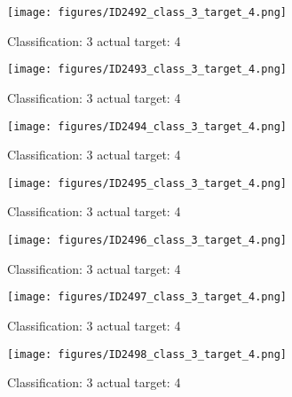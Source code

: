 \begin{figure}[h!]
\begin{center}
\texttt{[image: figures/ID2492\_class\_3\_target\_4.png]}
\end{center}
\caption{ Classification: 3 actual target: 4}
\label{fig:ID2492_class_3_target_4}
\end{figure}
\begin{figure}[h!]
\begin{center}
\texttt{[image: figures/ID2493\_class\_3\_target\_4.png]}
\end{center}
\caption{ Classification: 3 actual target: 4}
\label{fig:ID2493_class_3_target_4}
\end{figure}
\begin{figure}[h!]
\begin{center}
\texttt{[image: figures/ID2494\_class\_3\_target\_4.png]}
\end{center}
\caption{ Classification: 3 actual target: 4}
\label{fig:ID2494_class_3_target_4}
\end{figure}
\begin{figure}[h!]
\begin{center}
\texttt{[image: figures/ID2495\_class\_3\_target\_4.png]}
\end{center}
\caption{ Classification: 3 actual target: 4}
\label{fig:ID2495_class_3_target_4}
\end{figure}
\begin{figure}[h!]
\begin{center}
\texttt{[image: figures/ID2496\_class\_3\_target\_4.png]}
\end{center}
\caption{ Classification: 3 actual target: 4}
\label{fig:ID2496_class_3_target_4}
\end{figure}
\begin{figure}[h!]
\begin{center}
\texttt{[image: figures/ID2497\_class\_3\_target\_4.png]}
\end{center}
\caption{ Classification: 3 actual target: 4}
\label{fig:ID2497_class_3_target_4}
\end{figure}
\begin{figure}[h!]
\begin{center}
\texttt{[image: figures/ID2498\_class\_3\_target\_4.png]}
\end{center}
\caption{ Classification: 3 actual target: 4}
\label{fig:ID2498_class_3_target_4}
\end{figure}
